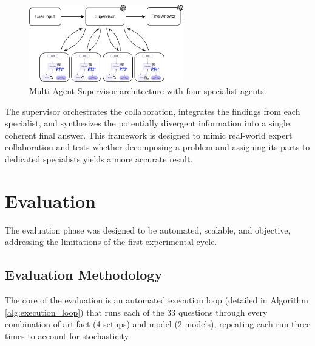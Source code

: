         \begin{figure}[h]
            \centering
            \includegraphics[width=0.6\textwidth]{images_exp2/diagrams/diagrama_multiagente_supervisor.png}
            \caption{Multi-Agent Supervisor architecture with four specialist agents.}
            \label{fig:diagrama_multiagente_supervisor}
        \end{figure}

        The supervisor orchestrates the collaboration, integrates the findings from each specialist, and synthesizes the potentially divergent information into a single, coherent final answer. This framework is designed to mimic real-world expert collaboration and tests whether decomposing a problem and assigning its parts to dedicated specialists yields a more accurate result.
        
        
\section{Evaluation}

    The evaluation phase was designed to be automated, scalable, and objective, addressing the limitations of the first experimental cycle.

    \subsection{Evaluation Methodology}

        The core of the evaluation is an automated execution loop (detailed in Algorithm \ref{alg:execution_loop}) that runs each of the 33 questions through every combination of artifact (4 setups) and model (2 models), repeating each run three times to account for stochasticity.

